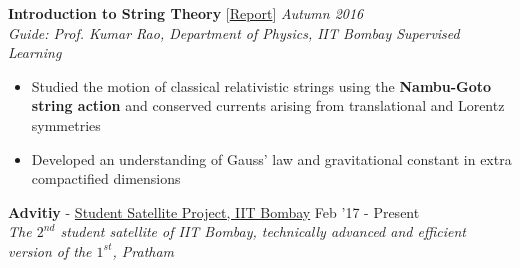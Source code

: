 \documentclass[10pt]{article}%
\newcommand{\xfilll}[2][1ex]{
\dimen0=#2\advance\dimen0 by #1
\leaders\hrule height \dimen0 depth -#1\hfill}
\begin{document}
{{\flushleft \bf \large{Introduction to String Theory}}   [\href{https://www.google.com/url?q=https%3A%2F%2Fbighome.iitb.ac.in%2Findex.php%2Fs%2Fh2gYWeT8Bbk2Wmr&sa=D&sntz=1&usg=AFQjCNFzDbrGThkVx7cXZQOkarlmLKg6bg}{Report}]  \hfill \textit{Autumn 2016} \\
{\em Guide: Prof. Kumar Rao, Department of Physics, IIT Bombay \hfill Supervised Learning}
\vspace{-1.5mm}
\begin{itemize}
\setlength\itemsep{0.01em}
    \item Studied the motion of classical relativistic strings using the \textbf{Nambu-Goto string action} and conserved currents arising from translational and Lorentz symmetries
    \item Developed an understanding of Gauss’ law and gravitational constant in extra compactified dimensions
\end{itemize}
{\flushleft  \large{\textbf{Advitiy} - \href{https://www.aero.iitb.ac.in/satlab/}{Student Satellite Project, IIT Bombay}}}  \hfill {{{Feb '17 - Present}}} \\
{\em The $\mathit{2^{nd}}$ student satellite of IIT Bombay, technically advanced and efficient version of the $\mathit{1^{st}}$, Pratham} 

}
\end{document}
